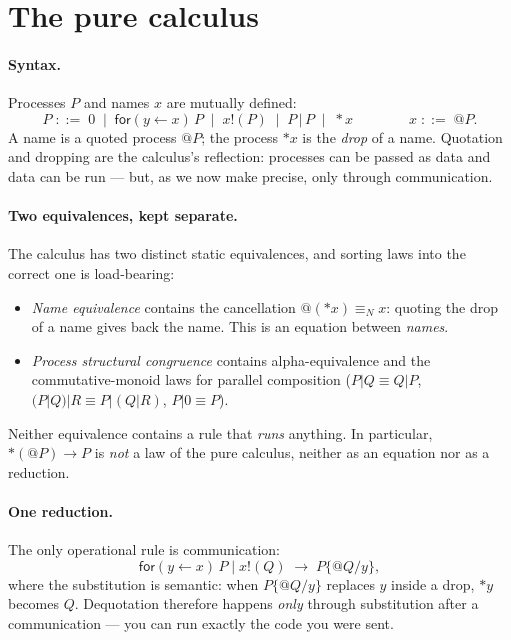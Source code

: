 \documentclass[11pt]{article}
\begin{document}
\section{The pure calculus}
\label{sec:pure}

\paragraph{Syntax.} Processes $P$ and names $x$ are mutually defined:
\[
P \;::=\; 0 \;\mid\; \mathsf{for}(y \leftarrow x)\,P \;\mid\; x!(P)
 \;\mid\; P \,|\, P \;\mid\; {*}x
\qquad\qquad
x \;::=\; @P .
\]
A name is a quoted process $@P$; the process ${*}x$ is the \emph{drop} of
a name. Quotation and dropping are the calculus's reflection: processes
can be passed as data and data can be run --- but, as we now make precise,
only through communication.

\paragraph{Two equivalences, kept separate.} The calculus has two
distinct static equivalences, and sorting laws into the correct one is
load-bearing:
\begin{itemize}
\item \emph{Name equivalence} contains the cancellation
  $@({*}x) \equiv_N x$: quoting the drop of a name gives back the name.
  This is an equation between \emph{names}.
\item \emph{Process structural congruence} contains
  alpha-equivalence and the commutative-monoid laws for parallel
  composition ($P|Q \equiv Q|P$, $(P|Q)|R \equiv P|(Q|R)$, $P|0 \equiv P$).
\end{itemize}
Neither equivalence contains a rule that \emph{runs} anything.
In particular, ${*}(@P) \to P$ is \emph{not} a law of the pure calculus,
neither as an equation nor as a reduction.

\paragraph{One reduction.} The only operational rule is communication:
\[
\mathsf{for}(y \leftarrow x)\,P \;\big|\; x!(Q)
\;\longrightarrow\;
P\{@Q/y\},
\]
where the substitution is semantic: when $P\{@Q/y\}$ replaces $y$ inside a
drop, ${*}y$ becomes $Q$. Dequotation therefore happens \emph{only}
through substitution after a communication --- you can run exactly the
code you were sent.
\end{document}

